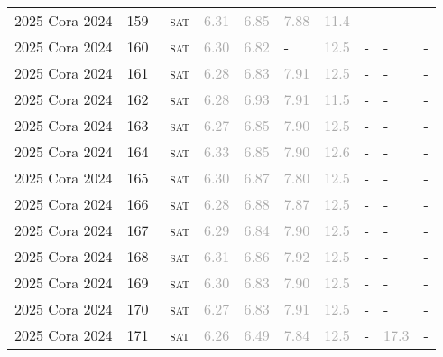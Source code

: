 \begin{center}
{\begin{longtable}{@{}llllllllll@{}}
2025 Cora 2024 & 159 & ~\textsc{sat} & \textcolor{darkgray}{6.31} & \textcolor{darkgray}{6.85} & \textcolor{darkgray}{7.88} & \textcolor{darkgray}{11.4} & - & - & - \\
2025 Cora 2024 & 160 & ~\textsc{sat} & \textcolor{darkgray}{6.30} & \textcolor{darkgray}{6.82} & - & \textcolor{darkgray}{12.5} & - & - & - \\
2025 Cora 2024 & 161 & ~\textsc{sat} & \textcolor{darkgray}{6.28} & \textcolor{darkgray}{6.83} & \textcolor{darkgray}{7.91} & \textcolor{darkgray}{12.5} & - & - & - \\
2025 Cora 2024 & 162 & ~\textsc{sat} & \textcolor{darkgray}{6.28} & \textcolor{darkgray}{6.93} & \textcolor{darkgray}{7.91} & \textcolor{darkgray}{11.5} & - & - & - \\
2025 Cora 2024 & 163 & ~\textsc{sat} & \textcolor{darkgray}{6.27} & \textcolor{darkgray}{6.85} & \textcolor{darkgray}{7.90} & \textcolor{darkgray}{12.5} & - & - & - \\
2025 Cora 2024 & 164 & ~\textsc{sat} & \textcolor{darkgray}{6.33} & \textcolor{darkgray}{6.85} & \textcolor{darkgray}{7.90} & \textcolor{darkgray}{12.6} & - & - & - \\
2025 Cora 2024 & 165 & ~\textsc{sat} & \textcolor{darkgray}{6.30} & \textcolor{darkgray}{6.87} & \textcolor{darkgray}{7.80} & \textcolor{darkgray}{12.5} & - & - & - \\
2025 Cora 2024 & 166 & ~\textsc{sat} & \textcolor{darkgray}{6.28} & \textcolor{darkgray}{6.88} & \textcolor{darkgray}{7.87} & \textcolor{darkgray}{12.5} & - & - & - \\
2025 Cora 2024 & 167 & ~\textsc{sat} & \textcolor{darkgray}{6.29} & \textcolor{darkgray}{6.84} & \textcolor{darkgray}{7.90} & \textcolor{darkgray}{12.5} & - & - & - \\
2025 Cora 2024 & 168 & ~\textsc{sat} & \textcolor{darkgray}{6.31} & \textcolor{darkgray}{6.86} & \textcolor{darkgray}{7.92} & \textcolor{darkgray}{12.5} & - & - & - \\
2025 Cora 2024 & 169 & ~\textsc{sat} & \textcolor{darkgray}{6.30} & \textcolor{darkgray}{6.83} & \textcolor{darkgray}{7.90} & \textcolor{darkgray}{12.5} & - & - & - \\
2025 Cora 2024 & 170 & ~\textsc{sat} & \textcolor{darkgray}{6.27} & \textcolor{darkgray}{6.83} & \textcolor{darkgray}{7.91} & \textcolor{darkgray}{12.5} & - & - & - \\
2025 Cora 2024 & 171 & ~\textsc{sat} & \textcolor{darkgray}{6.26} & \textcolor{darkgray}{6.49} & \textcolor{darkgray}{7.84} & \textcolor{darkgray}{12.5} & - & \textcolor{darkgray}{17.3} & - \\

\end{longtable}}
\end{center}
